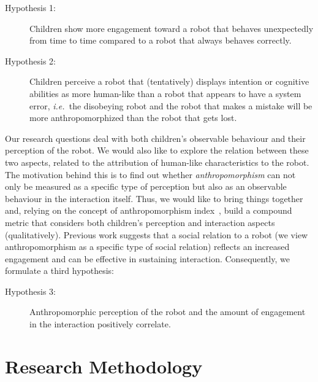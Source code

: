 \documentclass{sig-alternate}
\newcommand{\ie}{{\textit{i.e.~}}}
\begin{document}
\begin{description}

    \item[Hypothesis 1:] Children show more engagement toward a robot that
        behaves unexpectedly from time to time compared to a robot that always
        behaves correctly.

    \item[Hypothesis 2:] Children perceive a robot that (tentatively) displays
        intention or cognitive abilities as more human-like than a robot that
        appears to have a system error, \ie the disobeying robot and the robot
        that makes a mistake will be more anthropomorphized than the robot that
        gets lost.

\end{description}

Our research questions deal with both children's observable behaviour and their
perception of the robot. We would also like to explore the relation between
these two aspects, related to the attribution of human-like characteristics to
the robot. The motivation behind this is to find out whether
\textit{anthropomorphism} can not only be measured as a specific type of
perception but also as an observable behaviour in the interaction itself. Thus,
we would like to bring things together and, relying on the concept of
anthropomorphism index~\cite{fink2014dynamics}, build a compound metric that
considers both children's perception and interaction aspects (qualitatively).
Previous work suggests that a social relation to a robot (we view
anthropomorphism as a specific type of social relation) reflects an increased
engagement and can be effective in sustaining interaction.  Consequently, we
formulate a third hypothesis:

\begin{description}

    \item[Hypothesis 3:] Anthropomorphic perception of the robot and the amount
    of engagement in the interaction positively correlate.

\end{description}



\section{Research Methodology}
\end{document}
